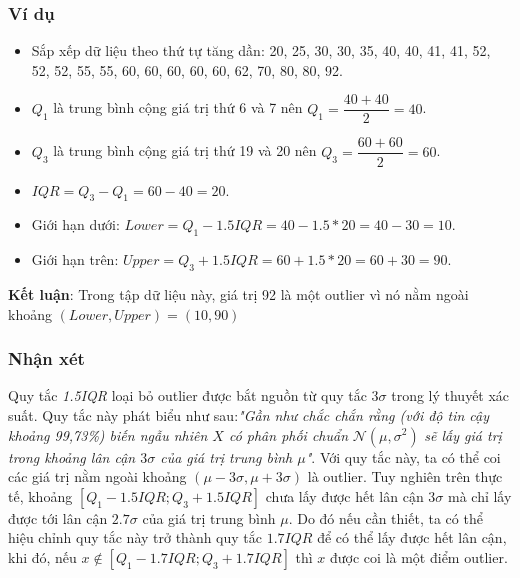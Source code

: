 \begin{frame}
\frametitle{Ví dụ}
\begin{itemize}
	\item Sắp xếp dữ liệu theo thứ tự tăng dần: 20, 25, 30, 30, 35, 40, 40, 41, 41, 52, 52, 52, 55, 55,  60, 60, 60, 60, 60, 62, 70, 80, 80, 92.
    \item $Q_1$ là trung bình cộng giá trị thứ 6 và 7 nên $Q_1 = \dfrac{40 + 40}{2} = 40$.
    \item $Q_3$ là trung bình cộng giá trị thứ 19 và 20 nên $Q_3 = \dfrac{60 + 60}{2} = 60$.
    \item $IQR = Q_3 - Q_1 = 60 - 40 = 20$.
    \item Giới hạn dưới: $Lower = Q_1 - 1.5IQR = 40 - 1.5*20 = 40 - 30 = 10$.
    \item Giới hạn trên: $Upper = Q_3 + 1.5IQR = 60 + 1.5*20 = 60 + 30 =  90$.
\end{itemize}
\textbf{Kết luận}: Trong tập dữ liệu này, giá trị 92 là một outlier vì nó nằm ngoài khoảng $(Lower, Upper) = (10,90)$
\end{frame}
\begin{frame}
\frametitle{Nhận xét}
Quy tắc \textit{1.5IQR} loại bỏ outlier được bắt nguồn từ quy tắc $3 \sigma$ trong lý thuyết xác suất. Quy tắc này phát biểu như sau:\textit{"Gần như chắc chắn rằng (với độ tin cậy khoảng 99,73\%) biến ngẫu nhiên $X$ có phân phối chuẩn} $\mathcal{N}(\mu, \sigma^2)$ \textit{sẽ lấy giá trị trong khoảng lân cận $3 \sigma$ của giá trị trung bình $\mu$"}. 
Với quy tắc này, ta có thể coi các giá trị nằm ngoài khoảng $(\mu - 3\sigma, \mu+3\sigma)$ là outlier. Tuy nghiên trên thực tế, khoảng $\left[Q_1-1.5IQR;Q_3+1.5IQR\right]$ chưa lấy được hết lân cận $3 \sigma$ mà chỉ lấy được tới lân cận $2.7 \sigma$ của giá trị trung bình $\mu$.
Do đó nếu cần thiết, ta có thể hiệu chỉnh quy tắc này trở thành quy tắc $1.7IQR$ để có thể lấy được hết lân cận, khi đó, nếu $x \notin \left[Q_1-1.7IQR; Q_3+1.7IQR\right]$ thì $x$ được coi là một điểm outlier.
\end{frame}
